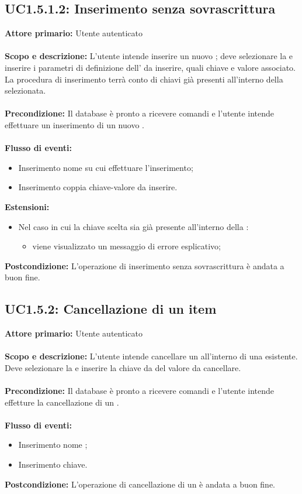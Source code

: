 \documentclass{scalatekids-article}
\begin{document}
\subsection{UC1.5.1.2: Inserimento senza sovrascrittura}
\textbf{Attore primario:} Utente autenticato \\ \\
\textbf{Scopo e descrizione:} L'utente intende inserire un nuovo ; deve selezionare la  e inserire i parametri di definizione dell' da inserire, quali chiave e valore associato. La procedura di inserimento terrà conto di chiavi già presenti all'interno della  selezionata.\\ \\
\textbf{Precondizione:} Il database è pronto a ricevere comandi e l'utente intende effettuare un inserimento di un nuovo .\\ \\
\textbf{Flusso di eventi:}
\begin{itemize}
\item Inserimento nome  su cui effettuare l'inserimento;
\item Inserimento coppia chiave-valore da inserire.
\end{itemize}
\textbf{Estensioni:}
\begin{itemize}
\item Nel caso in cui la chiave scelta sia già presente all'interno della :
  \begin{itemize}
  \item viene visualizzato un messaggio di errore esplicativo;
  \end{itemize}
\end{itemize}
\textbf{Postcondizione:} L'operazione di inserimento senza sovrascrittura è andata a buon fine.
\subsection{UC1.5.2: Cancellazione di un item}
\textbf{Attore primario:} Utente autenticato\\ \\
\textbf{Scopo e descrizione:} L'utente intende cancellare un  all'interno di una  esistente. Deve selezionare la  e inserire la chiave da del valore da cancellare.\\ \\
\textbf{Precondizione:} Il database è pronto a ricevere comandi e l'utente intende effetture la cancellazione di un .\\ \\
\textbf{Flusso di eventi:}
\begin{itemize}
\item Inserimento nome ;
\item Inserimento chiave.
\end{itemize}
\textbf{Postcondizione:} L'operazione di cancellazione di un  è andata a buon fine.
\end{document}
